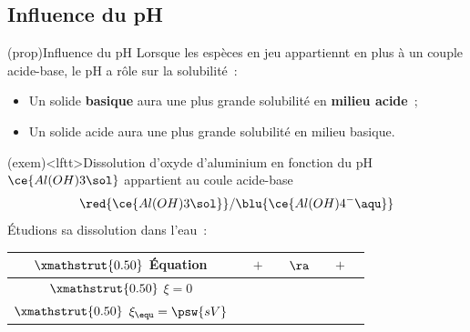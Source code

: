 \documentclass[../../main/main.tex]{subfiles}
\begin{document}
\subsection{Influence du pH}
\begin{tcb*}(prop){Influence du pH}
	Lorsque les espèces en jeu appartiennt en plus à un couple acide-base, le pH a
	rôle sur la solubilité~:
	\begin{itemize}
		\item Un solide \textbf{basique} aura une plus grande solubilité en
		      \textbf{milieu acide}~;
		\item Un solide acide aura une plus grande solubilité en milieu basique.
	\end{itemize}
\end{tcb*}
\begin{tcb*}(exem)<lftt>{Dissolution d'oxyde d'aluminium en fonction du pH}
	$\ce{Al(OH)3\sol}$ appartient au coule acide-base
	\[
		\red{\ce{Al(OH)3\sol}}/\blu{\ce{Al(OH)4^-\aqu}}
	\]
	Étudions sa dissolution dans l'eau~:
	\smallbreak
	\noindent
	\begin{minipage}[c]{.69\linewidth}
		\begin{center}
			\def\rhgt{0.50}
			\centering
			\begin{tabularx}{\linewidth}{|c||YdYdYdY|}
				\hline
				$\xmathstrut{\rhgt}$ \textbf{Équation} &
				               & $+$    &
				                  & $\ra$  &
				             & $+$    &
				                               \\
				\hline
				$\xmathstrut{\rhgt}$
				$\xi = 0$                              &
				                              & \vline &
				                            & \vline &
				                              & \vline &
				                              \\
				\hline
				$\xmathstrut{\rhgt}$
				$\xi_{\equ} = \psw{sV}$                &
				                         & \vline &
				                            & \vline &
				                             & \vline &
				                                \\
				\hline
			\end{tabularx}
		\end{center}
		\vspace{-15pt}
\end{minipage}
\end{tcb*}
\end{document}
